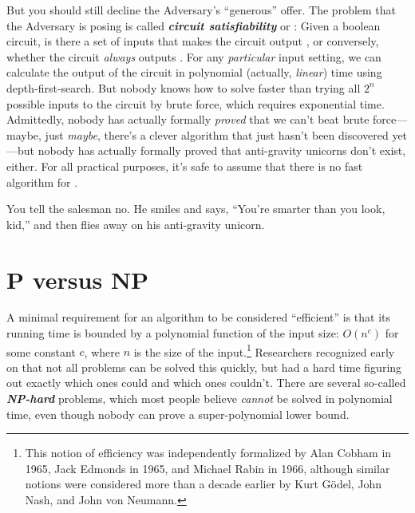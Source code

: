 But you should still decline the Adversary’s “generous” offer.
The problem that the Adversary is posing is called \textbf{\textit{circuit satisfiability}} or \textbf{\textit{}}: Given a boolean circuit, is there a set of inputs that makes the circuit output , or conversely, whether the circuit \textit{always} outputs .
For any \textit{particular} input setting, we can calculate the output of the circuit in polynomial (actually, \textit{linear}) time using depth-first-search.
But nobody knows how to solve  faster than trying all $2^n$ possible inputs to the circuit by brute force, which requires exponential time.
Admittedly, nobody has actually formally \textit{proved} that we can’t beat brute force---maybe, just \textit{maybe}, there’s a clever algorithm that just hasn’t been discovered yet---but nobody has actually formally proved that anti-gravity unicorns don’t exist, either.
For all practical purposes, it’s safe to assume that there is no fast algorithm for .

You tell the salesman no.
He smiles and says, “You’re smarter than you look, kid,” and then flies away on his anti-gravity unicorn.

\section{P versus NP}
\label{sec:12.2}

A minimal requirement for an algorithm to be considered “efficient” is that its running time is bounded by a polynomial function of the input size: $O(n^c)$ for some constant $c$, where $n$ is the size of the input.\footnote{This notion of efficiency was independently formalized by Alan Cobham in 1965, Jack Edmonds in 1965, and Michael Rabin in 1966, although similar notions were considered more than a decade earlier by Kurt Gödel, John Nash, and John von Neumann.}
Researchers recognized early on that not all problems can be solved this quickly, but had a hard time figuring out exactly which ones could and which ones couldn’t.
There are several so-called \textbf{\textit{NP-hard}} problems, which most people believe \textit{cannot} be solved in polynomial time, even though nobody can prove a super-polynomial lower bound.

